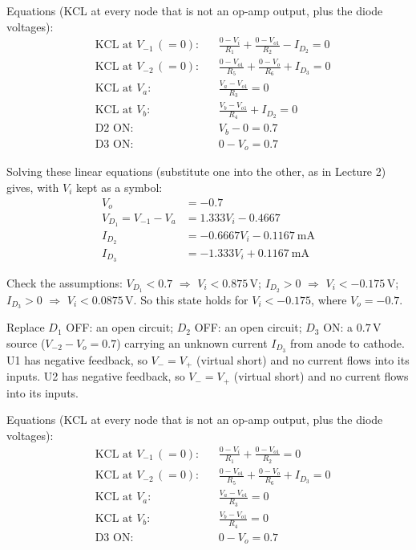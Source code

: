 \documentclass[11pt]{article}
\newcommand{\solstep}[2]{\par\medskip{\color{stepc}\textbf{Step #1 --- #2}}\par\nopagebreak}
\begin{document}
Equations (KCL at every node that is not an op-amp output, plus the diode voltages):\begin{align*}
&\text{KCL at }V_{-1}\,(=0): && \frac{0 - V_i}{R_{1}} + \frac{0 - V_{o1}}{R_{2}} - I_{D_{2}} = 0 \\
&\text{KCL at }V_{-2}\,(=0): && \frac{0 - V_{o1}}{R_{5}} + \frac{0 - V_{o}}{R_{6}} + I_{D_{3}} = 0 \\
&\text{KCL at }V_{a}: && \frac{V_{a} - V_{o1}}{R_{3}} = 0 \\
&\text{KCL at }V_{b}: && \frac{V_{b} - V_{o1}}{R_{4}} + I_{D_{2}} = 0 \\
&\text{D2 ON}: && V_{b} - 0 = 0.7 \\
&\text{D3 ON}: && 0 - V_{o} = 0.7
\end{align*}


Solving these linear equations (substitute one into the other, as in Lecture 2) gives, with $V_i$ kept as a symbol:\begin{align*}
V_{o} &= -0.7 \\
V_{D_{1}} = V_{-1} - V_{a} &= 1.333V_i - 0.4667 \\
I_{D_{2}} &= -0.6667V_i - 0.1167\ \mathrm{mA} \\
I_{D_{3}} &= -1.333V_i + 0.1167\ \mathrm{mA}
\end{align*}


Check the assumptions: $V_{D_{1}} < 0.7$ $\Rightarrow$ $V_i < 0.875$\,V; $I_{D_{2}} > 0$ $\Rightarrow$ $V_i < -0.175$\,V; $I_{D_{3}} > 0$ $\Rightarrow$ $V_i < 0.0875$\,V. So this state holds for $\boxed{V_i < -0.175}$, where $V_o = -0.7$.
\solstep{3}{Assume $D_{1}$ OFF, $D_{2}$ OFF, $D_{3}$ ON}Replace $D_{1}$ OFF: an open circuit; $D_{2}$ OFF: an open circuit; $D_{3}$ ON: a $0.7$\,V source ($V_{-2} - V_{o} = 0.7$) carrying an unknown current $I_{D_{3}}$ from anode to cathode. U1 has negative feedback, so $V_- = V_+$ (virtual short) and no current flows into its inputs. U2 has negative feedback, so $V_- = V_+$ (virtual short) and no current flows into its inputs.

Equations (KCL at every node that is not an op-amp output, plus the diode voltages):\begin{align*}
&\text{KCL at }V_{-1}\,(=0): && \frac{0 - V_i}{R_{1}} + \frac{0 - V_{o1}}{R_{2}} = 0 \\
&\text{KCL at }V_{-2}\,(=0): && \frac{0 - V_{o1}}{R_{5}} + \frac{0 - V_{o}}{R_{6}} + I_{D_{3}} = 0 \\
&\text{KCL at }V_{a}: && \frac{V_{a} - V_{o1}}{R_{3}} = 0 \\
&\text{KCL at }V_{b}: && \frac{V_{b} - V_{o1}}{R_{4}} = 0 \\
&\text{D3 ON}: && 0 - V_{o} = 0.7
\end{align*}
\end{document}
